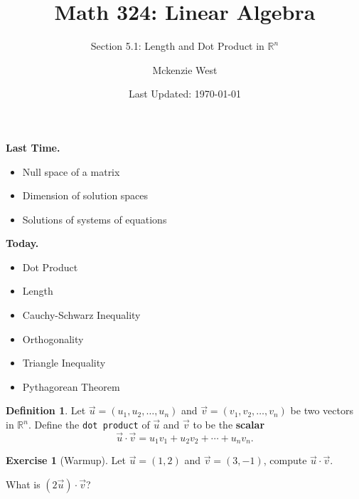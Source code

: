 \documentclass{beamer}
\newcommand{\R}{\mathbb{R}}
\newcommand{\vecu}{\vec{u}}
\newcommand{\fn}{\insertframenumber}
\theoremstyle{definition}
\newtheorem{exercise}{Exercise}
\newtheorem*{defn}{Definition}
\renewcommand{\emph}[1]{{\color{blue}\texttt{#1}}}
\begin{document}
	\title{Math 324: Linear Algebra}
	\subtitle{Section 5.1: Length and Dot Product in $\R^n$}
	\author{Mckenzie West}
	\date{Last Updated: \today}
\begin{frame}
\maketitle
\end{frame}

\begin{frame}{\insertframenumber}
	\begin{block}{\textbf{Last Time.}}
	\begin{itemize}[label=--]
		\item Null space of a matrix
		\item Dimension of solution spaces
		\item Solutions of systems of equations
	\end{itemize}
	\end{block}
	\begin{block}{\textbf{Today.}}
		\begin{itemize}[label=--]
			\item Dot Product
			\item Length
			\item Cauchy-Schwarz Inequality
			\item Orthogonality
			\item Triangle Inequality
			\item Pythagorean Theorem
		\end{itemize}
	\end{block}
\end{frame}
\begin{frame}{\fn}
	\begin{defn}
		Let $\vec u=(u_1,u_2,\dots,u_n)$ and $\vec v=(v_1,v_2,\dots,v_n)$ be two vectors in $\R^n$.  Define the \emph{dot product} of $\vec u$ and $\vec v$ to be the \textbf{scalar}
			\[\vec u\cdot\vec v=u_1v_1+u_2v_2+\cdots+u_nv_n.\]
	\end{defn}
	\begin{exercise}[Warmup]
		Let $\vec u=(1,2)$ and $\vec v=(3,-1)$, compute $\vec u\cdot \vec v$.  
		
		What is $(2\vecu)\cdot\vec v$?
	\end{exercise}
\end{frame}
\end{document}
